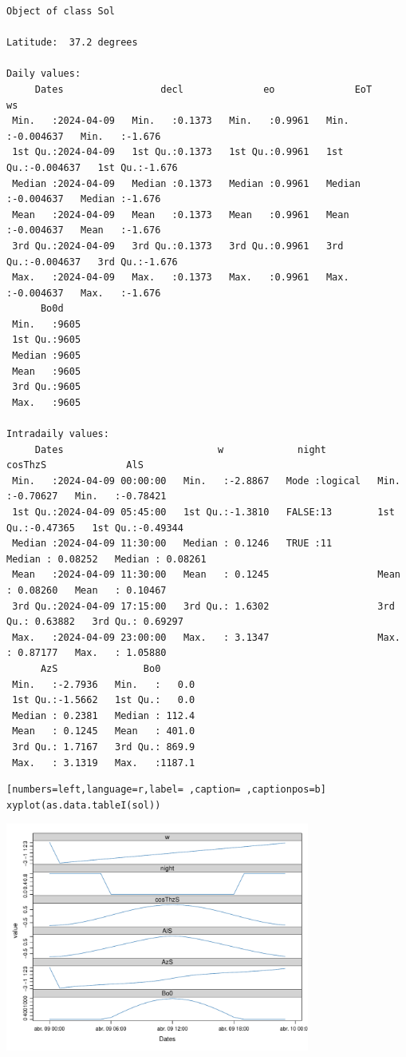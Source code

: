\begin{verbatim}
Object of class Sol 

Latitude:  37.2 degrees

Daily values:
     Dates                 decl              eo              EoT                  ws        
 Min.   :2024-04-09   Min.   :0.1373   Min.   :0.9961   Min.   :-0.004637   Min.   :-1.676  
 1st Qu.:2024-04-09   1st Qu.:0.1373   1st Qu.:0.9961   1st Qu.:-0.004637   1st Qu.:-1.676  
 Median :2024-04-09   Median :0.1373   Median :0.9961   Median :-0.004637   Median :-1.676  
 Mean   :2024-04-09   Mean   :0.1373   Mean   :0.9961   Mean   :-0.004637   Mean   :-1.676  
 3rd Qu.:2024-04-09   3rd Qu.:0.1373   3rd Qu.:0.9961   3rd Qu.:-0.004637   3rd Qu.:-1.676  
 Max.   :2024-04-09   Max.   :0.1373   Max.   :0.9961   Max.   :-0.004637   Max.   :-1.676  
      Bo0d     
 Min.   :9605  
 1st Qu.:9605  
 Median :9605  
 Mean   :9605  
 3rd Qu.:9605  
 Max.   :9605  

Intradaily values: 
     Dates                           w             night            cosThzS              AlS          
 Min.   :2024-04-09 00:00:00   Min.   :-2.8867   Mode :logical   Min.   :-0.70627   Min.   :-0.78421  
 1st Qu.:2024-04-09 05:45:00   1st Qu.:-1.3810   FALSE:13        1st Qu.:-0.47365   1st Qu.:-0.49344  
 Median :2024-04-09 11:30:00   Median : 0.1246   TRUE :11        Median : 0.08252   Median : 0.08261  
 Mean   :2024-04-09 11:30:00   Mean   : 0.1245                   Mean   : 0.08260   Mean   : 0.10467  
 3rd Qu.:2024-04-09 17:15:00   3rd Qu.: 1.6302                   3rd Qu.: 0.63882   3rd Qu.: 0.69297  
 Max.   :2024-04-09 23:00:00   Max.   : 3.1347                   Max.   : 0.87177   Max.   : 1.05880  
      AzS               Bo0        
 Min.   :-2.7936   Min.   :   0.0  
 1st Qu.:-1.5662   1st Qu.:   0.0  
 Median : 0.2381   Median : 112.4  
 Mean   : 0.1245   Mean   : 401.0  
 3rd Qu.: 1.7167   3rd Qu.: 869.9  
 Max.   : 3.1319   Max.   :1187.1
\end{verbatim}

\begin{lstlisting}[numbers=left,language=r,label= ,caption= ,captionpos=b]
xyplot(as.data.tableI(sol))
\end{lstlisting}
\begin{center}
\includegraphics[keepaspectratio,width=0.75\textwidth,height=0.5\textheight]{figuras/codigo-sol.pdf}
\end{center}


